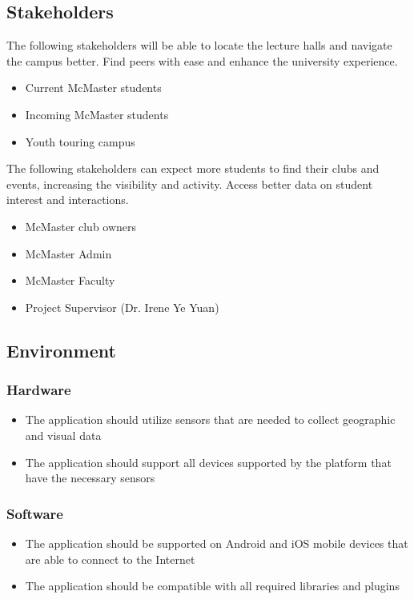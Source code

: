 \documentclass{article}
\begin{document}
\subsection{Stakeholders}

\quad The following stakeholders will be able to locate the lecture halls and navigate the campus better. Find peers with ease and enhance the university experience.

\begin{itemize}
    \item Current McMaster students
    \item Incoming McMaster students    
    \item Youth touring campus
\end{itemize}
    \quad The following stakeholders can expect more students to find their clubs and events, increasing the visibility and activity. Access better data on student interest and interactions. 
\begin{itemize}
    \item McMaster club owners
    \item McMaster Admin
    \item McMaster Faculty
    \item Project Supervisor (Dr. Irene Ye Yuan)
\end{itemize}

\subsection{Environment}
\subsubsection{Hardware}
\begin{itemize}
    \item The application should utilize sensors that are needed to collect geographic and visual data
    \item The application should support all devices supported by the platform that have the necessary sensors
\end{itemize}

\subsubsection{Software}
\begin{itemize}
    \item The application should be supported on Android and iOS mobile devices that are able to connect to the Internet
    \item The application should be compatible with all required libraries and plugins
\end{itemize}
\end{document}
